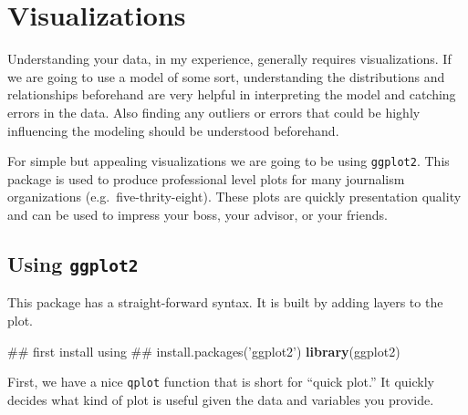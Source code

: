 \documentclass[]{tufte-book}
\newenvironment{Shaded}{}{}
\newcommand{\KeywordTok}[1]{\textcolor[rgb]{0.00,0.44,0.13}{\textbf{#1}}}
\newcommand{\OperatorTok}[1]{\textcolor[rgb]{0.40,0.40,0.40}{#1}}
\newcommand{\NormalTok}[1]{#1}
\theoremstyle{definition}
\theoremstyle{definition}
\theoremstyle{remark}
\begin{document}
\section*{Visualizations}\label{visualizations}

Understanding your data, in my experience, generally requires
visualizations. If we are going to use a model of some sort,
understanding the distributions and relationships beforehand are very
helpful in interpreting the model and catching errors in the data. Also
finding any outliers or errors that could be highly influencing the
modeling should be understood beforehand.

For simple but appealing visualizations we are going to be using
\texttt{ggplot2}. This package is used to produce professional level
plots for many journalism organizations (e.g.~five-thrity-eight). These
plots are quickly presentation quality and can be used to impress your
boss, your advisor, or your friends.

\subsection*{\texorpdfstring{Using
\texttt{ggplot2}}{Using ggplot2}}\label{using-ggplot2}

This package has a straight-forward syntax. It is built by adding layers
to the plot.

\begin{Shaded}
\begin{Highlighting}[]
\NormalTok{## first install using}
\NormalTok{## install.packages('ggplot2')}
\KeywordTok{library}\NormalTok{(ggplot2)}
\end{Highlighting}
\end{Shaded}

First, we have a nice \texttt{qplot} function that is short for ``quick
plot.'' It quickly decides what kind of plot is useful given the data
and variables you provide.

\begin{Shaded}
\end{Shaded}
\end{document}
